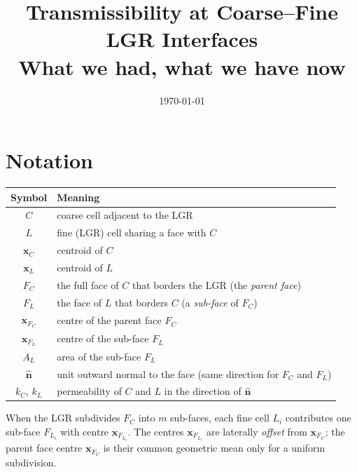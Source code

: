 \documentclass[11pt,a4paper]{article}
\title{%
  Transmissibility at Coarse--Fine LGR Interfaces\\[0.4em]
  \large What we had, what we have now}
\author{}
\date{\today}
\begin{document}
\maketitle

\section{Notation}

\begin{center}
\begin{tabular}{cl}
\toprule
Symbol & Meaning \\
\midrule
$C$               & coarse cell adjacent to the LGR \\
$L$               & fine (LGR) cell sharing a face with $C$ \\
$\mathbf{x}_C$    & centroid of $C$ \\
$\mathbf{x}_L$    & centroid of $L$ \\
$F_C$             & the full face of $C$ that borders the LGR
                    (the \emph{parent face}) \\
$F_L$             & the face of $L$ that borders $C$
                    (a \emph{sub-face} of $F_C$) \\
$\mathbf{x}_{F_C}$& centre of the parent face $F_C$ \\
$\mathbf{x}_{F_L}$& centre of the sub-face $F_L$ \\
$A_L$             & area of the sub-face $F_L$ \\
$\hat{\mathbf{n}}$& unit outward normal to the face
                    (same direction for $F_C$ and $F_L$) \\
$k_C,\,k_L$      & permeability of $C$ and $L$
                    in the direction of $\hat{\mathbf{n}}$ \\
\bottomrule
\end{tabular}
\end{center}

\bigskip

When the LGR subdivides $F_C$ into $m$ sub-faces, each fine cell $L_i$
contributes one sub-face $F_{L_i}$ with centre $\mathbf{x}_{F_{L_i}}$.
The centres $\mathbf{x}_{F_{L_i}}$ are laterally \emph{offset} from
$\mathbf{x}_{F_C}$; the parent face centre $\mathbf{x}_{F_C}$ is their
common geometric mean only for a uniform subdivision.

\end{document}
